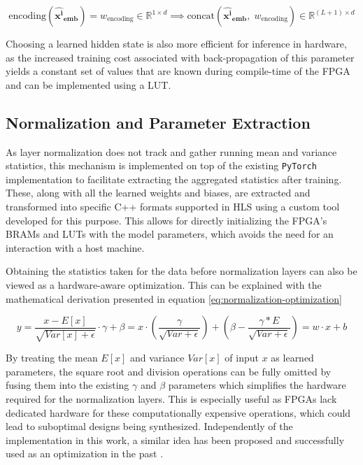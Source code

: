 \begin{equation}\label{eq:encoding}
  \text{encoding} ( \bm{\hat{x^i}_{\text{emb}}} ) = w_{\text{encoding}} \in \mathbb{R}^{1 \times d} \implies \text{concat} (\bm{\hat{x^i}_{\text{emb}}},\; w_{\text{encoding}}) \in \mathbb{R}^{(L+1) \times d}
\end{equation}

Choosing a learned hidden state is also more efficient for inference in hardware, as the increased training cost associated with back-propagation of this parameter yields a constant set of values that are known during compile-time of the FPGA and can be implemented using a LUT.


\subsection{Normalization and Parameter Extraction}
As layer normalization does not track and gather running mean and variance statistics, this mechanism is implemented on top of the existing \texttt{PyTorch} implementation to facilitate extracting the aggregated statistics after training. These, along with all the learned weights and biases, are extracted and transformed into specific C++ formats supported in HLS using a custom tool developed for this purpose. This allows for directly initializing the FPGA's BRAMs and LUTs with the model parameters, which avoids the need for an interaction with a host machine.

Obtaining the statistics taken for the data before normalization layers can also be viewed as a hardware-aware optimization. This can be explained with the mathematical derivation presented in equation \ref{eq:normalization-optimization}

\begin{equation}\label{eq:normalization-optimization}
  y = \frac{x - E[x]}{\sqrt{Var[x] + \epsilon}} \cdot \gamma + \beta = x \cdot (\frac{\gamma}{\sqrt{Var + \epsilon}}) + (\beta - \frac{\gamma * E}{\sqrt{Var + \epsilon}}) = w \cdot x + b
\end{equation}

By treating the mean \(E[x]\) and variance \(Var[x]\) of input \(x\) as learned parameters, the square root and division operations can be fully omitted by fusing them into the existing \(\gamma\) and \(\beta\) parameters which simplifies the hardware required for the normalization layers. This is especially useful as FPGAs lack dedicated hardware for these computationally expensive operations, which could lead to suboptimal designs being synthesized. Independently of the implementation in this work, a similar idea has been proposed and successfully used as an optimization in the past \cite{46-fan2018real-time}.

